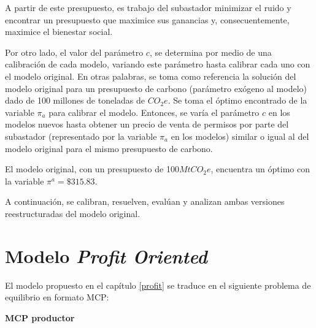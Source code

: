 A partir de este presupuesto, es trabajo del subastador minimizar el ruido y encontrar un presupuesto que maximice sus ganancias y, consecuentemente, maximice el bienestar social.
\vspace{2.5mm}


Por otro lado, el valor del parámetro $c$, se determina por medio de una calibración de cada modelo, variando este parámetro hasta calibrar cada uno con el modelo original. En otras palabras, se toma como referencia la solución del modelo original para un presupuesto de carbono (parámetro exógeno al modelo)  dado de 100 millones de toneladas de $CO_{2}e$. Se toma el óptimo encontrado de la variable $\pi_a$ para calibrar el modelo. Entonces, se varía el parámetro $c$ en los modelos nuevos hasta obtener un precio de venta de permisos por parte del subastador (representado por la variable $\pi_a$ en los modelos) similar o igual al del modelo original para el mismo presupuesto de carbono.
\vspace{2.5mm}

El modelo original, con un presupuesto de 100$MtCO_{2}e$, encuentra un óptimo con la variable $\pi^a= \$315.83$.
\vspace{2.5mm}

A continuación, se calibran, resuelven, evalúan y analizan ambas versiones reestructuradas del modelo original.

\section{Modelo \textit{Profit Oriented}} \label{resultadosprofit}

El modelo propuesto en el capítulo \ref{profit} se traduce en el siguiente problema de equilibrio en formato MCP: 

\textbf{MCP productor}

